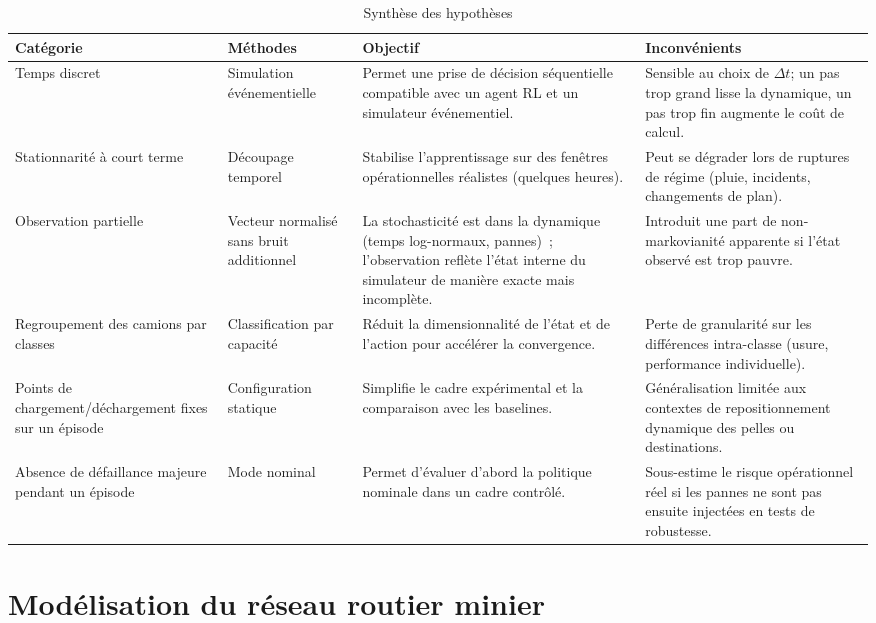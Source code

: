 \documentclass[11pt,a4paper]{report}
\begin{document}
\begin{table}[H]
    \centering
    \caption{Synthèse des hypothèses}
    \label{tab:hypotheses-justification-limites}
    \begin{tabularx}{\textwidth}{>{\raggedright\arraybackslash}p{} >{\raggedright\arraybackslash}p{} >{\raggedright\arraybackslash}X >{\raggedright\arraybackslash}X}
        \toprule
        \textbf{Catégorie} & \textbf{Méthodes} & \textbf{Objectif} & \textbf{Inconvénients} \\
        \midrule
        Temps discret & Simulation événementielle & Permet une prise de décision séquentielle compatible avec un agent RL et un simulateur événementiel. & Sensible au choix de $\Delta t$; un pas trop grand lisse la dynamique, un pas trop fin augmente le coût de calcul. \\
        Stationnarité à court terme & Découpage temporel & Stabilise l'apprentissage sur des fenêtres opérationnelles réalistes (quelques heures). & Peut se dégrader lors de ruptures de régime (pluie, incidents, changements de plan). \\
        Observation partielle & Vecteur normalisé sans bruit additionnel & La stochasticité est dans la dynamique (temps log-normaux, pannes)~; l'observation reflète l'état interne du simulateur de manière exacte mais incomplète. & Introduit une part de non-markovianité apparente si l'état observé est trop pauvre. \\
        Regroupement des camions par classes & Classification par capacité & Réduit la dimensionnalité de l'état et de l'action pour accélérer la convergence. & Perte de granularité sur les différences intra-classe (usure, performance individuelle). \\
        Points de chargement/déchargement fixes sur un épisode & Configuration statique & Simplifie le cadre expérimental et la comparaison avec les baselines. & Généralisation limitée aux contextes de repositionnement dynamique des pelles ou destinations. \\
        Absence de défaillance majeure pendant un épisode & Mode nominal & Permet d'évaluer d'abord la politique nominale dans un cadre contrôlé. & Sous-estime le risque opérationnel réel si les pannes ne sont pas ensuite injectées en tests de robustesse. \\
        \bottomrule
    \end{tabularx}
\end{table}

\section{Modélisation du réseau routier minier}
\label{sec:reseau-routier}
\end{document}
